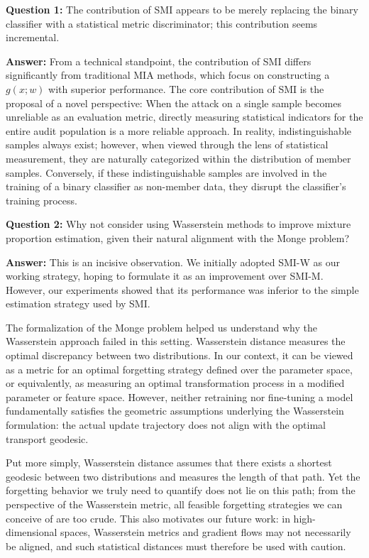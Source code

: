 \documentclass{article}
\theoremstyle{plain}
\theoremstyle{definition}
\theoremstyle{remark}
\begin{document}
\textbf{Question 1:} The contribution of SMI appears to be merely replacing the binary classifier with a statistical metric discriminator; this contribution seems incremental.

\textbf{Answer:} From a technical standpoint, the contribution of SMI differs significantly from traditional MIA methods, which focus on constructing a $g(x;w)$ with superior performance. The core contribution of SMI is the proposal of a novel perspective: When the attack on a single sample becomes unreliable as an evaluation metric, directly measuring statistical indicators for the entire audit population is a more reliable approach. In reality, indistinguishable samples always exist; however, when viewed through the lens of statistical measurement, they are naturally categorized within the distribution of member samples. Conversely, if these indistinguishable samples are involved in the training of a binary classifier as non-member data, they disrupt the classifier's training process.

\textbf{Question 2:} Why not consider using Wasserstein methods to improve mixture proportion estimation, given their natural alignment with the Monge problem?

\textbf{Answer:} This is an incisive observation. We initially adopted SMI-W as our working strategy, hoping to formulate it as an improvement over SMI-M. However, our experiments showed that its performance was inferior to the simple estimation strategy used by SMI.

The formalization of the Monge problem helped us understand why the Wasserstein approach failed in this setting. Wasserstein distance measures the optimal discrepancy between two distributions. In our context, it can be viewed as a metric for an optimal forgetting strategy defined over the parameter space, or equivalently, as measuring an optimal transformation process in a modified parameter or feature space. However, neither retraining nor fine-tuning a model fundamentally satisfies the geometric assumptions underlying the Wasserstein formulation: the actual update trajectory does not align with the optimal transport geodesic.

Put more simply, Wasserstein distance assumes that there exists a shortest geodesic between two distributions and measures the length of that path. Yet the forgetting behavior we truly need to quantify does not lie on this path; from the perspective of the Wasserstein metric, all feasible forgetting strategies we can conceive of are too crude. This also motivates our future work: in high-dimensional spaces, Wasserstein metrics and gradient flows may not necessarily be aligned, and such statistical distances must therefore be used with caution.
\end{document}
